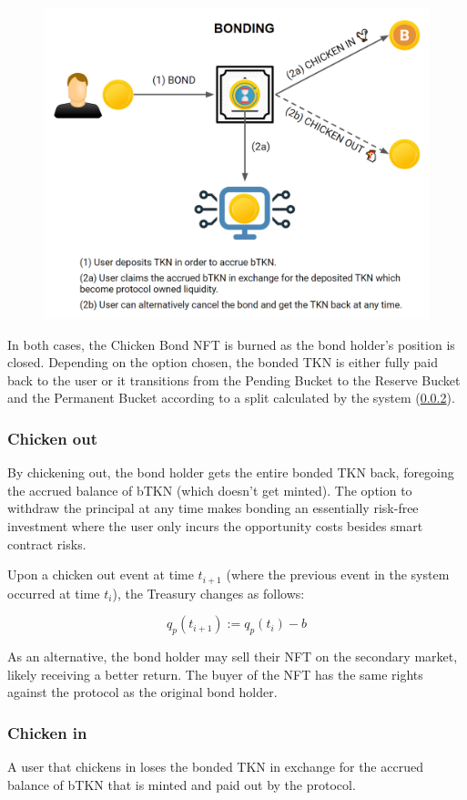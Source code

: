 \documentclass{article}
\begin{document}
\begin{figure}[ht]
    \centering
    \includegraphics[width=0.5\linewidth]{./ChickenBonds_Whitepaper_ci_co.png}
\end{figure}

In both cases, the Chicken Bond NFT is burned as the bond holder’s position is closed. Depending on the option chosen, the bonded TKN is either fully paid back to the user or it transitions from the Pending Bucket to the Reserve Bucket and the Permanent Bucket according to a split calculated by the system (\ref{sec:chicken-in}). 

\subsubsection{Chicken out}
\label{sec:chicken-out}
By chickening out, the bond holder gets the entire bonded TKN back, foregoing the accrued balance of bTKN (which doesn’t get minted). The option to withdraw the principal at any time makes bonding an essentially risk-free investment where the user only incurs the opportunity costs besides smart contract risks.

Upon a chicken out event at time $t_{i+1}$ (where the previous event in the system occurred at time $t_i$), the Treasury changes as follows:

\begin{equation}
  \label{eq:chicken-out-transition}
    q_p(t_{i+1}) := q_p(t_i) - b
\end{equation}

As an alternative, the bond holder may sell their NFT on the secondary market, likely receiving a better return. The buyer of the NFT has the same rights against the protocol as the original bond holder.

\subsubsection{Chicken in}
\label{sec:chicken-in}
A user that chickens in loses the bonded TKN in exchange for the accrued balance of bTKN that is minted and paid out by the protocol. 
\end{document}
